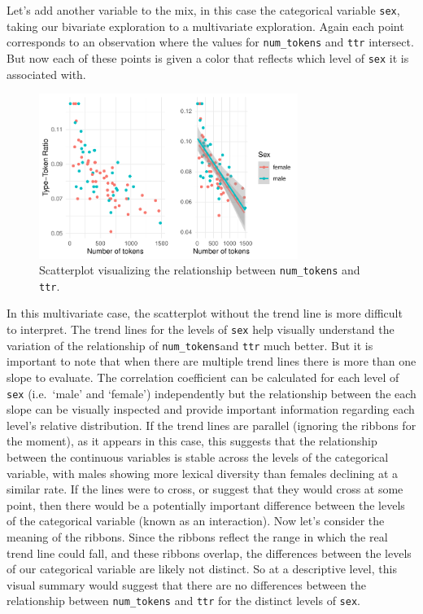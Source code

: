 \documentclass[
  letterpaper,
]{latex/krantz}
\begin{document}
Let's add another variable to the mix, in this case the categorical
variable \texttt{sex}, taking our bivariate exploration to a
multivariate exploration. Again each point corresponds to an observation
where the values for \texttt{num\_tokens} and \texttt{ttr} intersect.
But now each of these points is given a color that reflects which level
of \texttt{sex} it is associated with.

\begin{figure}[h]

{\centering \includegraphics[width=0.75\textwidth,height=\textheight]{approaching-analysis_files/figure-pdf/fig-summaries-multivariate-scatterplot-belc-1.pdf}

}

\caption{\label{fig-summaries-multivariate-scatterplot-belc}Scatterplot
visualizing the relationship between \texttt{num\_tokens} and
\texttt{ttr}.}

\end{figure}

In this multivariate case, the scatterplot without the trend line is
more difficult to interpret. The trend lines for the levels of
\texttt{sex} help visually understand the variation of the relationship
of \texttt{num\_tokens}and \texttt{ttr} much better. But it is important
to note that when there are multiple trend lines there is more than one
slope to evaluate. The correlation coefficient can be calculated for
each level of \texttt{sex} (i.e.~`male' and `female') independently but
the relationship between the each slope can be visually inspected and
provide important information regarding each level's relative
distribution. If the trend lines are parallel (ignoring the ribbons for
the moment), as it appears in this case, this suggests that the
relationship between the continuous variables is stable across the
levels of the categorical variable, with males showing more lexical
diversity than females declining at a similar rate. If the lines were to
cross, or suggest that they would cross at some point, then there would
be a potentially important difference between the levels of the
categorical variable (known as an interaction). Now let's consider the
meaning of the ribbons. Since the ribbons reflect the range in which the
real trend line could fall, and these ribbons overlap, the differences
between the levels of our categorical variable are likely not distinct.
So at a descriptive level, this visual summary would suggest that there
are no differences between the relationship between \texttt{num\_tokens}
and \texttt{ttr} for the distinct levels of \texttt{sex}.
\end{document}
